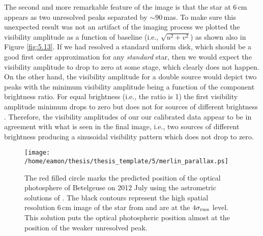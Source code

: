 The second and more remarkable feature of the image is that the star at 6\,cm appears as two unresolved peaks separated by $\sim 90$\,mas. To make sure this unexpected result was not an artifact of the imaging process we plotted the visibility amplitude as a function of baseline (i.e., $\sqrt{u^2 + v^2}$) as shown also in Figure \ref{fig:5.13}. If we had resolved a standard uniform disk, which should be a good first order approximation for any \textit{standard} star, then we would expect the visibility amplitude to drop to zero at some stage, which clearly does not happen. On the other hand, the visibility amplitude for a double source would depict two peaks with the minimum visibility amplitude being a function of the component brightness ratio. For equal brightness (i.e., the ratio is 1) the first visibility amplitude minimum drops to zero but does not for sources of different brightness \citep{saha_2011}. Therefore, the visibility amplitudes of our our calibrated data appear to be in agreement with what is seen in the final image, i.e., two sources of different brightness producing a sinusoidal visibility pattern which does not drop to zero. 

\begin{figure}[!ht]
\centering 
          \texttt{[image: /home/eamon/thesis/thesis\_template/5/merlin\_parallax.ps]}
\caption[Predicted position of Betelgeuse on 2012 July using the astrometric solutions of \cite{harper_2001}.]{The red filled circle marks the predicted position of the optical photosphere of Betelgeuse on 2012 July using the astrometric solutions of \cite{harper_2001}. The black contours represent the high spatial resolution 6\,cm image of the star from \cite{richards_2013} and are at the $4\sigma _{\rm{rms}}$ level. This solution puts the optical photospheric position almost at the position of the weaker unresolved peak.}
\label{fig:5.14}
\end{figure}

